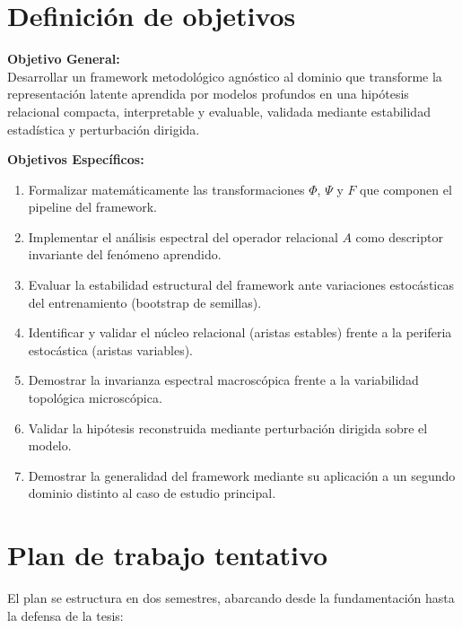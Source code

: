 \documentclass[12pt,letterpaper]{article}
\begin{document}
\section{Definición de objetivos}

\textbf{Objetivo General:}\\
Desarrollar un framework metodológico agnóstico al dominio que transforme la representación latente aprendida por modelos profundos en una hipótesis relacional compacta, interpretable y evaluable, validada mediante estabilidad estadística y perturbación dirigida.

\vspace{0.3cm}
\textbf{Objetivos Específicos:}
\begin{enumerate}[leftmargin=*, itemsep=0pt]
    \item Formalizar matemáticamente las transformaciones $\Phi$, $\Psi$ y $F$ que componen el pipeline del framework.
    \item Implementar el análisis espectral del operador relacional $A$ como descriptor invariante del fenómeno aprendido.
    \item Evaluar la estabilidad estructural del framework ante variaciones estocásticas del entrenamiento (bootstrap de semillas).
    \item Identificar y validar el núcleo relacional (aristas estables) frente a la periferia estocástica (aristas variables).
    \item Demostrar la invarianza espectral macroscópica frente a la variabilidad topológica microscópica.
    \item Validar la hipótesis reconstruida mediante perturbación dirigida sobre el modelo.
    \item Demostrar la generalidad del framework mediante su aplicación a un segundo dominio distinto al caso de estudio principal.
\end{enumerate}

\section{Plan de trabajo tentativo}

El plan se estructura en dos semestres, abarcando desde la fundamentación hasta la defensa de la tesis:
\end{document}
